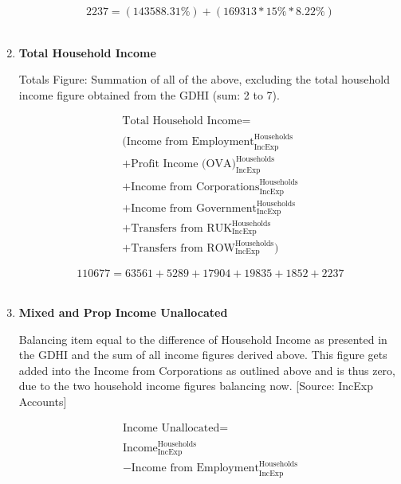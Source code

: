 \begin{enumerate}
\begin{equation} \nonumber
2237 = (143588.31\%)+(169313*15\%*8.22\%)
\end{equation}\\

\item \textbf {Total Household Income}

Totals Figure: Summation of all of the above, excluding the total household income figure obtained from the GDHI (sum: 2 to 7).

\begin{equation}
\begin{split}
\text{Total Household Income} =  \\ \\
(\text{Income from Employment}^\text{Households}_\text{IncExp}\\
+\text{Profit Income (OVA)}^\text{Households}_\text{IncExp}\\
+\text{Income from Corporations}^\text{Households}_\text{IncExp}\\
+\text{Income from Government}^\text{Households}_\text{IncExp}\\
+\text{Transfers from RUK}^\text{Households}_\text{IncExp}\\
+\text{Transfers from ROW}^\text{Households}_\text{IncExp})
\end{split} \label{eq:2.5.12}
\end{equation}

\begin{equation} \nonumber
110677 = 63561+5289+17904+19835+1852+2237
\end{equation}\\


\item \textbf {Mixed and Prop Income Unallocated}

Balancing item equal to the difference of Household Income as presented in the GDHI and the sum of all income figures derived above. This figure gets added into the Income from Corporations as outlined above and is thus zero, due to the two household income figures balancing now. [Source: IncExp Accounts] \cite{ONS2011b}

\begin{equation}
\begin{split}
\text{Income Unallocated} =  \\ \\
\text{Income}^\text{Households}_\text{IncExp}\\
-\text{Income from Employment}^\text{Households}_\text{IncExp}
\end{split} \label{eq:2.5.13}
\end{equation}



\end{enumerate}
